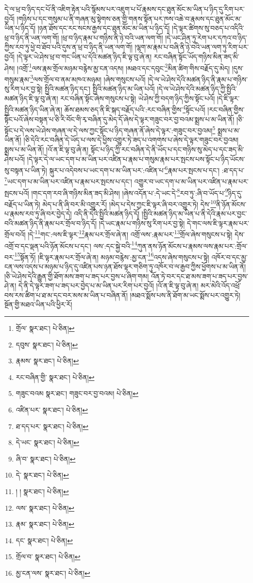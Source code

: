 དེ་ལ་ཕྲ་བ་ཉིད་དང་པོ་ནི་འཇིག་རྟེན་པའི་སྙོམས་པར་འཇུག་པ་པོ་རྣམས་དང་ཐུན་མོང་མ་ཡིན་པ་ཉིད་དུ་རིག་པར་བྱའོ། །གཉིས་པ་དང་གསུམ་པ་ནི་གཞན་མུ་སྟེགས་ཅན་གྱི་གནས་སྟོན་པར་ཁས་འཆེ་བ་རྣམས་དང་ཐུན་མོང་མ་ཡིན་པ་ཉིད་དོ། །ཉན་ཐོས་དང་རང་སངས་རྒྱས་དང་ཐུན་མོང་མ་ཡིན་པ་ཉིད་དོ། །དེ་ལྟར་ཚིགས་སུ་བཅད་པ་འདིའི་ཕྲ་བ་ཉིད་ནི་ཡན་ལག་གོ། །ཕྲ་བ་ཉིད་རྣམ་པ་གཉིས་ནི་ཉེ་བའི་ཡན་ལག་གོ། །དེ་ཡང་ཤིན་ཏུ་རེག་པར་དཀའ་བ་ཉིད་ཀྱིས་རབ་ཏུ་ཕྱེ་བ་ཐོབ་པའི་དུས་ན་ཕྲ་བ་ཉིད་ནི་ཡན་ལག་གོ། །ལྷག་མ་རྣམ་པ་བཞི་ནི་ཉེ་བའི་ཡན་ལག་ཏུ་རིག་པར་བྱའོ། །དེ་ལྟར་ཡེ་ཤེས་ཕྲ་བ་གང་ཡིན་པ་དེའི་མཚན་ཉིད་ཇི་ལྟ་བུ་ཞེ་ན། རང་བཞིན་སྟོང་ཡོད་གཉིས་མིན་ཟད་མི་ཤེས། །འགྲོ་\footnote{གྲོལ་  སྣར་ཐང་།  པེ་ཅིན། }ལས་རྣམ་གྲོལ་མཉམ་བརྙེས་མྱ་ངན་འདས། །མཐའ་དང་དབུང་\footnote{དབུས་  སྣར་ཐང་།  པེ་ཅིན། }མིན་ཚིག་གིས་བརྗོད་དུ་མེད། །དུས་གསུམ་རྣམ་\footnote{རྣམས་  སྣར་ཐང་།  པེ་ཅིན། }ལས་གྲོལ་བ་ནམ་མཁའ་མཉམ། །ཞེས་གསུངས་པའོ། །དེ་ལ་ཡེ་ཤེས་དེའི་མཚན་ཉིད་ནི་རྣམ་པ་གཉིས་སུ་རིག་པར་བྱ་སྟེ། སྤྱིའི་མཚན་ཉིད་དང་། སྤྱིའི་མཚན་ཉིད་མ་ཡིན་པའོ། །དེ་ལ་ཡེ་ཤེས་དེའི་མཚན་ཉིད་ཀྱི་སྤྱིའི་མཚན་ཉིད་ཇི་ལྟ་བུ་ཞེ་ན། རང་བཞིན་སྟོང་ཞེས་གསུངས་པ་སྟེ། ཡེ་ཤེས་ཀྱི་བདག་ཉིད་ཀྱིས་སྟོང་པའོ། །དེ་ཇི་ལྟར་སྤྱིའི་མཚན་ཉིད་ཡིན་ཞེ་ན། ཆོས་ཐམས་ཅད་ནི་ཇི་སྐད་བརྗོད་པའི་:རང་བཞིན་གྱིས་\footnote{རང་བཞིན་གྱི་  སྣར་ཐང་།  པེ་ཅིན། }སྟོང་པའོ། །རང་བཞིན་གྱིས་སྟོང་པའོ་ཞེས་བསྟན་པ་ཅི་རི་བོང་གི་རྭ་བཞིན་དུ་མེད་དོ་ཞེས་དེ་ལྟར་གཟུང་བར་བྱ་བའམ་སྨྲས་པ་མ་ཡིན་ནོ། །ཅི་སྟོང་པ་དེ་ལས་ཡེ་ཤེས་གཞན་ལ་དེ་ལས་ཀྱང་སྟོང་པ་ཉིད་གཞན་ནོ་ཞེས་དེ་ལྟར་:གཟུང་བར་བྱའམ།\footnote{གཟུང་བའམ  སྣར་ཐང་། གཟུང་བར་བྱ་བའམ།  པེ་ཅིན། } སྨྲས་པ་མ་ཡིན་ནོ། །ཅི་དེའི་རང་བཞིན་དེ་ཡོད་པ་ལས་དེ་ཕྱིས་འགྱུར་ཏེ་ཟད་པ་འགགས་པ་ཞེས་དེ་ལྟར་གཟུང་བར་བྱའམ། སྨྲས་པ་མ་ཡིན་ནོ། །འོ་ན་ཇི་ལྟ་བུ་ཞེ་ན། སྟོང་པ་ཉིད་ཀྱི་རང་བཞིན་དེ་ནི་ཡོད་པ་དང་གཉིས་སུ་མེད་པ་དང་ཟད་མི་ཤེས་པའོ། །དེ་ལྟར་དེ་ལ་ཡང་དག་པ་མ་ཡིན་པར་འཛིན་པ་རྣམ་པ་གསུམ་རྣམ་པར་སྤངས་པས་སྟོང་པ་ཉིད་ཡོངས་སུ་བསྟན་པ་ཡིན་ཏེ། སྐུར་པ་འདེབས་པ་ཡང་དག་པ་མ་ཡིན་པར་:འཛིན་པ་\footnote{འཛིན་པར་  སྣར་ཐང་།  པེ་ཅིན། }རྣམ་པར་སྤངས་པ་དང་། :ཐ་དད་པ་\footnote{ཐ་དད་པར་  སྣར་ཐང་།  པེ་ཅིན། }ཡང་དག་པ་མ་ཡིན་པར་འཛིན་པ་རྣམ་པར་སྤངས་པ་དང་། འགྱུར་བ་ཡང་དག་པ་མ་ཡིན་པར་འཛིན་པ་རྣམ་པར་སྤངས་པའོ། །གང་དག་རབ་ཞི་གཉིས་མིན་ཟད་མི་ཤེས། །ཞེས་འདོན་པ་:དེ་ཡང་དེ་\footnote{དེ་ཡང་  སྣར་ཐང་།  པེ་ཅིན། }རབ་ཏུ་:ཞི་བ་ཡོད་པ་\footnote{ཞི་བ་  སྣར་ཐང་།  པེ་ཅིན། }ཉིད་དུ་བརྗོད་པ་ཡིན་ཏེ། མེད་པ་ནི་ཞི་བར་མི་འགྱུར་རོ། །མེད་པ་དེས་ཀྱང་ཇི་ལྟར་ཞི་བར་འགྱུར་ཏེ། དེས་\footnote{དེ་  སྣར་ཐང་།  པེ་ཅིན། }ནི་ཉོན་མོངས་པ་རྣམས་རབ་ཏུ་ཞི་བར་བྱེད་དེ། འདི་ནི་དེའི་སྤྱིའི་མཚན་ཉིད་དོ། །སྤྱིའི་མཚན་ཉིད་མ་ཡིན་པ་ནི་དེའི་རྣམ་པར་བྱང་བའི་མཚན་ཉིད་ནི་རྣམ་པར་གྲོལ་བ་ཉིད་དོ། །དེ་ཡང་རྣམ་པ་གཉིས་སུ་རིག་པར་བྱ་སྟེ། དེ་གང་ལས་ཇི་ལྟར་རྣམ་པར་གྲོལ་བའོ། །དེ་\footnote{། །  སྣར་ཐང་།  པེ་ཅིན། }གང་:ལས་ཇི་ལྟར་\footnote{ལས་  སྣར་ཐང་།  པེ་ཅིན། }རྣམ་པར་གྲོལ་ཞེ་ན། འགྲོ་ལས་:རྣམ་པར་\footnote{རྣམ་  སྣར་ཐང་།  པེ་ཅིན། }གྲོལ་ཞེས་གསུངས་པ་སྟེ། དེས་འགྲོ་བ་དང་ལྡན་པའི་ཉོན་མོངས་པ་དང་། ལས་:དང་སྐྱེ་བའི་\footnote{དང་  སྣར་ཐང་།  པེ་ཅིན། }ཀུན་ནས་ཉོན་མོངས་པ་རྣམས་ལས་རྣམ་པར་:གྲོལ་བར་\footnote{གྲོལ་བ་  སྣར་ཐང་།  པེ་ཅིན། }སྟོན་ཏོ། །ཇི་ལྟར་རྣམ་པར་གྲོལ་ཞེ་ན། མཉམ་བརྙེས་:མྱ་ངན་\footnote{མྱ་ངན་ལས་  སྣར་ཐང་།  པེ་ཅིན། }འདས་ཞེས་གསུངས་པ་སྟེ། འཁོར་བ་དང་མྱ་ངན་ལས་འདས་པ་མཉམ་པ་ཉིད་དུ་འཛིན་པས་ཉན་ཐོས་ལྟར་གཅིག་ཏུ་འཁོར་བ་ལ་རྒྱབ་ཀྱིས་ཕྱོགས་པ་མ་ཡིན་ནོ། །ཅི་ཡེ་ཤེས་དེའི་རྒྱུན་གྱི་ཐོག་མས་ཟག་པ་ཟད་པར་བྱས་པ་ཞིག་གམ། འོན་ཏེ་བར་དང་ཐ་མས་ཟག་པ་ཟད་པར་བྱས་ཤེ་ན། དེ་ནི་དེ་ལྟར་ཟག་པ་ཟད་པར་བྱེད་པ་མ་ཡིན་པར་རིག་པར་བྱའོ། །འོ་ན་ཇི་ལྟ་བུ་ཞེ་ན། མར་མེའི་འོད་འཕྲོ་བས་རས་ཚིག་པ་ཐ་མ་དང་བར་མས་མ་ཡིན་པ་བཞིན་ནོ། །མཐའ་སྨོས་པས་ནི་ཐོག་མ་ཡང་སྨོས་པར་འགྱུར་ཏེ། སྔོན་གྱི་མཐའ་ཡིན་པའི་ཕྱིར་རོ། 